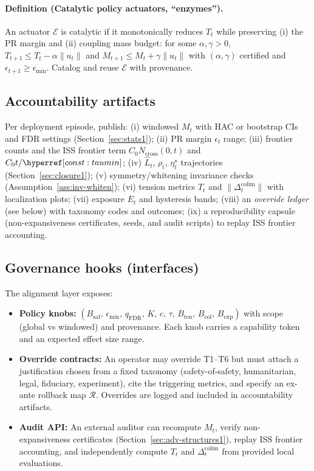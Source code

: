 \paragraph{Definition (Catalytic policy actuators, ``enzymes'').} An actuator $\mathcal E$ is catalytic if it monotonically reduces $T_t$ while preserving (i) the PR margin and (ii) coupling mass budget: for some $\alpha,\gamma>0$, $T_{t+1}\le T_t-\alpha\|u_t\|$ and $M_{t+1}\le M_t+\gamma\|u_t\|$ with $(\alpha,\gamma)$ certified and $\epsilon_{t+1}\ge\epsilon_{\min}$. Catalog and reuse $\mathcal E$ with provenance.

\subsection*{Accountability artifacts}
Per deployment episode, publish: (i) windowed $M_t$ with HAC or bootstrap CIs and FDR settings (Section~\ref{sec:stats1}); (ii) PR margin $\epsilon_t$ range; (iii) frontier counts and the ISS frontier term $C_0 N_{\mathrm{cross}}(0,t)$ and $C_0 t/\constref{taumin}$; (iv) $\widehat L_t$, $\rho_t$, $\eta^\star_t$ trajectories (Section~\ref{sec:closure1}); (v) symmetry/whitening invariance checks (Assumption~\ref{ass:inv-whiten}); (vi) tension metrics $T_t$ and $\|\Delta^{\mathrm{colim}}_t\|$ with localization plots; (vii) exposure $E_t$ and hysteresis bands; (viii) an \emph{override ledger} (see below) with taxonomy codes and outcomes; (ix) a reproducibility capsule (non-expansiveness certificates, seeds, and audit scripts) to replay ISS frontier accounting.

\subsection*{Governance hooks (interfaces)}
The alignment layer exposes:
\begin{itemize}[leftmargin=*]
  \item \textbf{Policy knobs:} $(B_{\mathrm{saf}},\,\epsilon_{\min},\,q_{\mathrm{FDR}},\,K,\,c,\,\tau,\,B_{\mathrm{ten}},\,B_{\mathrm{col}},\,B_{\mathrm{exp}})$ with scope (global vs windowed) and provenance. Each knob carries a capability token and an expected effect size range.
  \item \textbf{Override contracts:} An operator may override T1--T6 but must attach a justification chosen from a fixed taxonomy (safety-of-safety, humanitarian, legal, fiduciary, experiment), cite the triggering metrics, and specify an ex-ante rollback map $\mathcal R$. Overrides are logged and included in accountability artifacts.
  \item \textbf{Audit API:} An external auditor can recompute $M_t$, verify non-expansiveness certificates (Section~\ref{sec:adv-structures1}), replay ISS frontier accounting, and independently compute $T_t$ and $\Delta^{\mathrm{colim}}_t$ from provided local evaluations.
\end{itemize}

